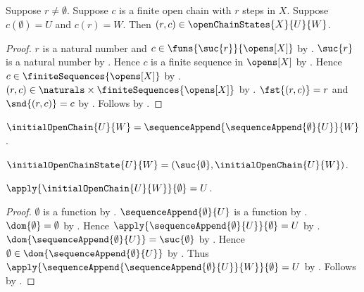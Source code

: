 \begin{proposition}\label{open_chain_state_intro}
    Suppose $r\neq\emptyset$.
    Suppose $c$ is a finite open chain with $r$ steps in $X$.
    Suppose $c(\emptyset)=U$ and $c(r)=W$.
    Then $(r,c)\in\openChainStates{X}{U}{W}$.
\end{proposition}
\begin{proof}
    $r$ is a natural number and
        $c\in\funs{\suc{r}}{\opens[X]}$
        by .
    $\suc{r}$ is a natural number by .
    Hence $c$ is a finite sequence in $\opens[X]$
        by .
    Hence $c\in\finiteSequences{\opens[X]}$
        by .
    $(r,c)\in\naturals\times\finiteSequences{\opens[X]}$
        by .
    $\fst{(r,c)}=r$ and $\snd{(r,c)}=c$ by .
    Follows by .
\end{proof}

\begin{definition}\label{initial_open_chain}
    $\initialOpenChain{U}{W}=
        \sequenceAppend{\sequenceAppend{\emptyset}{U}}{W}$.
\end{definition}

\begin{definition}\label{initial_open_chain_state}
    $\initialOpenChainState{U}{W}=
        (\suc{\emptyset},\initialOpenChain{U}{W})$.
\end{definition}

\begin{proposition}\label{initial_open_chain_zero}
    $\apply{\initialOpenChain{U}{W}}{\emptyset}=U$.
\end{proposition}
\begin{proof}
    $\emptyset$ is a function by .
    $\sequenceAppend{\emptyset}{U}$ is a function
        by .
    $\dom{\emptyset}=\emptyset$ by .
    Hence $\apply{\sequenceAppend{\emptyset}{U}}{\emptyset}=U$
        by .
    $\dom{\sequenceAppend{\emptyset}{U}}=\suc{\emptyset}$
        by .
    Hence $\emptyset\in\dom{\sequenceAppend{\emptyset}{U}}$
        by .
    Thus $\apply{\sequenceAppend{\sequenceAppend{\emptyset}{U}}{W}}
            {\emptyset}=U$
        by .
    Follows by .
\end{proof}

